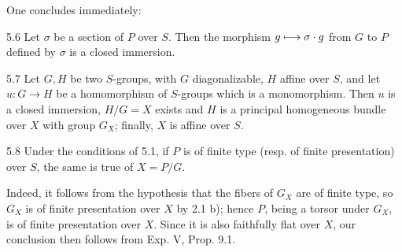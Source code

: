 One concludes immediately:
\begin{corollary}{5.6}\label{VIII.5.6}
Let $\sigma$ be a section of $P$ over $S$. Then the morphism $g\longmapsto\sigma\cdot g$ from $G$ to $P$ defined by $\sigma$ is a closed immersion.
\end{corollary}
\begin{corollary}{5.7}\label{VIII.5.7}
Let $G,H$ be two $S$-groups, with $G$ diagonalizable, $H$ affine over $S$, and let $u:G\to H$ be a homomorphism of $S$-groups which is a monomorphism. Then $u$ is a closed immersion, $H/G=X$ exists and $H$ is a principal homogeneous bundle over $X$ with group $G_X$; finally, $X$ is affine over $S$.
\end{corollary}
\begin{corollary}{5.8}\label{VIII.5.8}
Under the conditions of 5.1, if $P$ is of finite type (resp. of finite presentation) over $S$, the same is true of $X=P/G$.
\end{corollary}
Indeed, it follows from the hypothesis that the fibers of $G_X$ are of finite type, so $G_X$ is of finite presentation over $X$ by 2.1 b); hence $P$, being a torsor under $G_X$, is of finite presentation over $X$. Since it is also faithfully flat over $X$, our conclusion then follows from Exp. V, Prop. 9.1.

